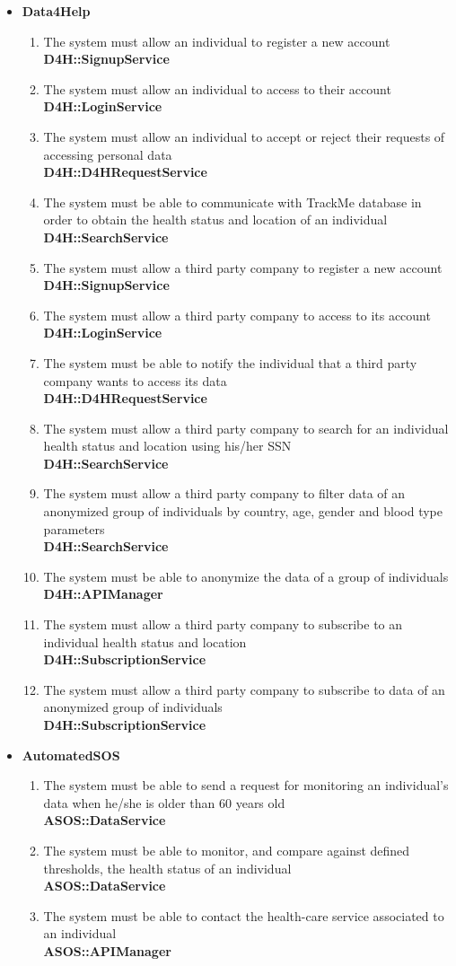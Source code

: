 \documentclass[a4paper, hidelinks, 12pt]{report}
\newcommand\requirement[1]{\item[{[R#1]}] }
\begin{document}
\begin{itemize}
	\item{\textbf{Data4Help}}
	\begin{enumerate}
		\requirement{1} The system must allow an individual to register a new account \\
		\textbf{D4H::SignupService}
		\requirement{2} The system must allow an individual to access to their account \\
		\textbf{D4H::LoginService}
		\requirement{3} The system must allow an individual to accept or reject their requests of accessing personal data \\
		\textbf{D4H::D4HRequestService}
		\requirement{4} The system must be able to communicate with TrackMe database in order to obtain the health status and location of an individual \\
		\textbf{D4H::SearchService}
		\requirement{5} The system must allow a third party company to register a new account \\								\textbf{D4H::SignupService}
		\requirement{6} The system must allow a third party company to access to its account 	\\								\textbf{D4H::LoginService}
		\requirement{7} The system must be able to notify the individual that a third party company wants to access its data \\
		\textbf{D4H::D4HRequestService}
		\requirement{8} The system must allow a third party company to search for an individual health status and location using his/her SSN \\
		 \textbf{D4H::SearchService}
		 \requirement{9} The system must allow a third party company to filter data of an anonymized group of individuals by country, age, gender and blood type parameters \\ 
		 \textbf{D4H::SearchService}
		 \requirement{10} The system must be able to anonymize the data of a group of individuals \\
		 \textbf{D4H::APIManager}
		 \requirement{11} The system must allow a third party company to subscribe to an individual health status and location \\ 
		\textbf{D4H::SubscriptionService}
		\requirement{12} The system must allow a third party company to subscribe to data of an anonymized group of individuals \\
		\textbf{D4H::SubscriptionService}
	\end{enumerate}	
		
	\item{\textbf{AutomatedSOS}}
	\begin{enumerate}
		\requirement{13} The system must be able to send a request for monitoring an individual's data when he/she is older than 60 years old \\
		\textbf{ASOS::DataService}
		\requirement{14} The system must be able to monitor, and compare against defined thresholds, the health status of an individual \\
		\textbf{ASOS::DataService}
		\requirement{15} The system must be able to contact the health-care service associated to an individual \\
		\textbf{ASOS::APIManager}
	\end{enumerate}
	

\end{itemize}
\end{document}
